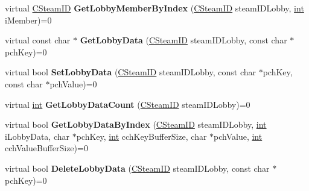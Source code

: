 \begin{DoxyCompactItemize}
\item 
\hypertarget{classISteamMatchmaking_af482f04ee3661cce04ad736b596cd0bd}{}virtual \hyperlink{classCSteamID}{C\+Steam\+I\+D} {\bfseries Get\+Lobby\+Member\+By\+Index} (\hyperlink{classCSteamID}{C\+Steam\+I\+D} steam\+I\+D\+Lobby, \hyperlink{SDL__thread_8h_a6a64f9be4433e4de6e2f2f548cf3c08e}{int} i\+Member)=0\label{classISteamMatchmaking_af482f04ee3661cce04ad736b596cd0bd}

\item 
\hypertarget{classISteamMatchmaking_a4a06e468689eae616b1d7c42a7a974e1}{}virtual const char $\ast$ {\bfseries Get\+Lobby\+Data} (\hyperlink{classCSteamID}{C\+Steam\+I\+D} steam\+I\+D\+Lobby, const char $\ast$pch\+Key)=0\label{classISteamMatchmaking_a4a06e468689eae616b1d7c42a7a974e1}

\item 
\hypertarget{classISteamMatchmaking_a70674d1431d8213b0401ac85b0e9ff12}{}virtual bool {\bfseries Set\+Lobby\+Data} (\hyperlink{classCSteamID}{C\+Steam\+I\+D} steam\+I\+D\+Lobby, const char $\ast$pch\+Key, const char $\ast$pch\+Value)=0\label{classISteamMatchmaking_a70674d1431d8213b0401ac85b0e9ff12}

\item 
\hypertarget{classISteamMatchmaking_ab97a7c5766d3b6d412ac472b21aef311}{}virtual \hyperlink{SDL__thread_8h_a6a64f9be4433e4de6e2f2f548cf3c08e}{int} {\bfseries Get\+Lobby\+Data\+Count} (\hyperlink{classCSteamID}{C\+Steam\+I\+D} steam\+I\+D\+Lobby)=0\label{classISteamMatchmaking_ab97a7c5766d3b6d412ac472b21aef311}

\item 
\hypertarget{classISteamMatchmaking_a023c45bec3f3aec3934254440b87b1ed}{}virtual bool {\bfseries Get\+Lobby\+Data\+By\+Index} (\hyperlink{classCSteamID}{C\+Steam\+I\+D} steam\+I\+D\+Lobby, \hyperlink{SDL__thread_8h_a6a64f9be4433e4de6e2f2f548cf3c08e}{int} i\+Lobby\+Data, char $\ast$pch\+Key, \hyperlink{SDL__thread_8h_a6a64f9be4433e4de6e2f2f548cf3c08e}{int} cch\+Key\+Buffer\+Size, char $\ast$pch\+Value, \hyperlink{SDL__thread_8h_a6a64f9be4433e4de6e2f2f548cf3c08e}{int} cch\+Value\+Buffer\+Size)=0\label{classISteamMatchmaking_a023c45bec3f3aec3934254440b87b1ed}

\item 
\hypertarget{classISteamMatchmaking_a1cfc86681d82aee096417445c3c267f9}{}virtual bool {\bfseries Delete\+Lobby\+Data} (\hyperlink{classCSteamID}{C\+Steam\+I\+D} steam\+I\+D\+Lobby, const char $\ast$pch\+Key)=0\label{classISteamMatchmaking_a1cfc86681d82aee096417445c3c267f9}


\end{DoxyCompactItemize}
